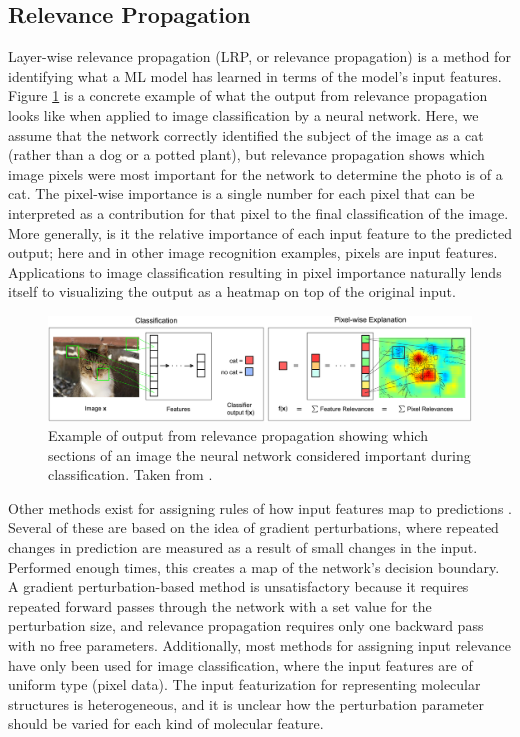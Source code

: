 \documentclass[12pt]{article}
\begin{document}
\subsection{Relevance Propagation}
\label{sec:org297d4ea}

Layer-wise relevance propagation (LRP, or relevance propagation) is a method for identifying what a ML model has learned \cite{10.1371/journal.pone.0130140} in terms of the model's input features. Figure \ref{fig:orgaf82215} is a concrete example of what the output from relevance propagation looks like when applied to image classification by a neural network. Here, we assume that the network correctly identified the subject of the image as a cat (rather than a dog or a potted plant), but relevance propagation shows which image pixels were most important for the network to determine the photo is of a cat. The pixel-wise importance is a single number for each pixel that can be interpreted as a contribution for that pixel to the final classification of the image. More generally, is it the relative importance of each input feature to the predicted output; here and in other image recognition examples, pixels are input features. Applications to image classification resulting in pixel importance naturally lends itself to visualizing the output as a heatmap on top of the original input.

\begin{figure}[htbp]
\centering
\includegraphics[width=.9\linewidth]{2-Figure1-1.png}
\caption{\label{fig:orgaf82215}
Example of output from relevance propagation showing which sections of an image the neural network considered important during classification. Taken from \parencite{10.1371/journal.pone.0130140}.}
\end{figure}

Other methods exist for assigning rules of how input features map to predictions \cite{Finnegan105957,2017arXiv170303717S,2016arXiv161107478L}. Several of these are based on the idea of gradient perturbations, where repeated changes in prediction are measured as a result of small changes in the input. Performed enough times, this creates a map of the network's decision boundary\cite{wiki:db}. A gradient perturbation-based method is unsatisfactory because it requires repeated forward passes through the network with a set value for the perturbation size, and relevance propagation requires only one backward pass with no free parameters. Additionally, most methods for assigning input relevance have only been used for image classification, where the input features are of uniform type (pixel data). The input featurization for representing molecular structures\cite{2017arXiv170205532F} is heterogeneous, and it is unclear how the perturbation parameter should be varied for each kind of molecular feature.
\end{document}

